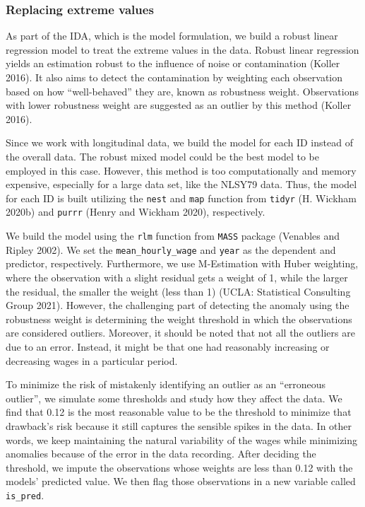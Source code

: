 \documentclass{article}
\begin{document}
\hypertarget{replacing-extreme-values}{%
\subsubsection{Replacing extreme values}\label{replacing-extreme-values}}

As part of the IDA, which is the model formulation, we build a robust linear regression model to treat the extreme values in the data. Robust linear regression yields an estimation robust to the influence of noise or contamination (Koller 2016). It also aims to detect the contamination by weighting each observation based on how ``well-behaved'' they are, known as robustness weight. Observations with lower robustness weight are suggested as an outlier by this method (Koller 2016).

Since we work with longitudinal data, we build the model for each ID instead of the overall data. The robust mixed model could be the best model to be employed in this case. However, this method is too computationally and memory expensive, especially for a large data set, like the NLSY79 data. Thus, the model for each ID is built utilizing the \texttt{nest} and \texttt{map} function from \texttt{tidyr} (H. Wickham 2020b) and \texttt{purrr} (Henry and Wickham 2020), respectively.

We build the model using the \texttt{rlm} function from \texttt{MASS} package (Venables and Ripley 2002). We set the \texttt{mean\_hourly\_wage} and \texttt{year} as the dependent and predictor, respectively. Furthermore, we use M-Estimation with Huber weighting, where the observation with a slight residual gets a weight of 1, while the larger the residual, the smaller the weight (less than 1) (UCLA: Statistical Consulting Group 2021). However, the challenging part of detecting the anomaly using the robustness weight is determining the weight threshold in which the observations are considered outliers. Moreover, it should be noted that not all the outliers are due to an error. Instead, it might be that one had reasonably increasing or decreasing wages in a particular period.

To minimize the risk of mistakenly identifying an outlier as an ``erroneous outlier'', we simulate some thresholds and study how they affect the data. We find that 0.12 is the most reasonable value to be the threshold to minimize that drawback's risk because it still captures the sensible spikes in the data. In other words, we keep maintaining the natural variability of the wages while minimizing anomalies because of the error in the data recording. After deciding the threshold, we impute the observations whose weights are less than 0.12 with the models' predicted value. We then flag those observations in a new variable called \texttt{is\_pred}.
\end{document}
